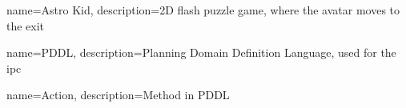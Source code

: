 \makeglossaries

{
	name={Astro Kid},
	description={2D flash puzzle game, where the avatar moves to the exit }
}

{
	name={PDDL},
	description={Planning Domain Definition Language, used for the \acrshort{ipc}}
}

{
	name={Action},
	description={Method in PDDL}
}

